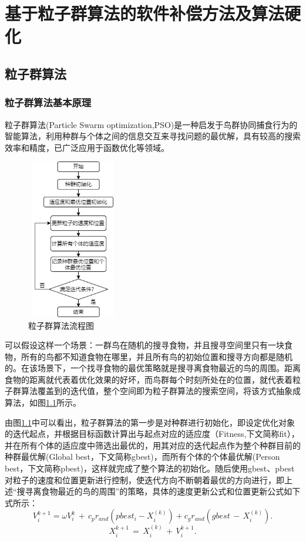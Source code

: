 
\chapter{基于粒子群算法的软件补偿方法及算法硬化}
\section{粒子群算法}
\subsection{粒子群算法基本原理}

粒子群算法(Particle Swarm optimization,PSO)是一种启发于鸟群协同捕食行为的智能算法，利用种群与个体之间的信息交互来寻找问题的最优解，具有较高的搜索效率和精度\cite{潘红丽2022基于改进粒子群算法的垃圾清运车辆低碳路径规划}，已广泛应用于函数优化等领域\cite{2022Environmental}。

\begin{figure}[htb]
  \centering
  \includegraphics[width=4cm,height=7cm]{fig/4-fig/粒子群算法流程图.png}
  \caption{粒子群算法流程图}
  \label{fig:粒子群算法流程图}
\end{figure}
可以假设这样一个场景：一群鸟在随机的搜寻食物，并且搜寻空间里只有一块食物，所有的鸟都不知道食物在哪里，并且所有鸟的初始位置和搜寻方向都是随机的。在该场景下，一个找寻食物的最优策略就是搜寻离食物最近的鸟的周围。距离食物的距离就代表着优化效果的好坏，而鸟群每个时刻所处在的位置，就代表着粒子群算法覆盖到的迭代值，整个空间即为粒子群算法的搜索空间，将该方式抽象成算法，如图\ref{fig:粒子群算法流程图}所示。

由图\ref{fig:粒子群算法流程图}中可以看出，粒子群算法的第一步是对种群进行初始化，即设定优化对象的迭代起点，并根据目标函数计算出与起点对应的适应度（Fitness,下文简称fit），并在所有个体的适应度中筛选出最优的，用其对应的迭代起点作为整个种群目前的种群最优解(Global best，下文简称gbest)，而所有个体的个体最优解(Person best，下文简称pbest)，这样就完成了整个算法的初始化。随后使用gbest、pbest对粒子的速度和位置更新进行控制，使迭代方向不断朝着最优的方向进行，即上述“搜寻离食物最近的鸟的周围”的策略，具体的速度更新公式和位置更新公式如下式所示：
\begin{equation}\label{eq:粒子群算法速度更新}
  V^{k+1}_i=\omega V^{k}_i\,+\,c_pr_{and}(pbest_i-X^{(k)}_i)+c_gr_{and}(gbest\,-\,X^{(k)}_i).
\end{equation}
\begin{equation}\label{eq:粒子群算法位置新}
    X^{k+1}_i\,=\,X^{(k)}_i\,+\,V_i^{k+1}.
\end{equation}

